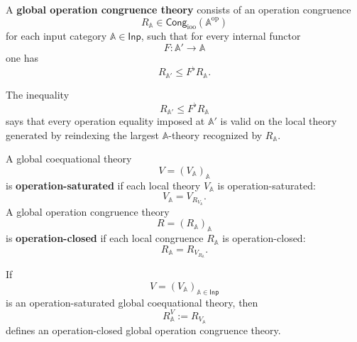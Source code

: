 \begin{definition}
\label{def:global-operation-congruence-theory-corrected}
    A \textbf{global operation congruence theory} consists of an operation
    congruence
    \[
        R_{\mathbb A}\in
        \mathsf{Cong}_{\mathrm{ioo}}(\mathbb A^{\mathrm{op}})
    \]
    for each input category \(\mathbb A\in\mathsf{Inp}\), such that for every
    internal functor
    \[
        F:\mathbb A'\to\mathbb A
    \]
    one has
    \[
        R_{\mathbb A'}\leq F^\flat R_{\mathbb A}.
    \]
\end{definition}

The inequality
\[
    R_{\mathbb A'}\leq F^\flat R_{\mathbb A}
\]
says that every operation equality imposed at \(\mathbb A'\) is valid on the
local theory generated by reindexing the largest \(\mathbb A\)-theory
recognized by \(R_{\mathbb A}\).

\begin{definition}
\label{def:global-operation-saturation-closure}
    A global coequational theory
    \[
        V=(V_{\mathbb A})_{\mathbb A}
    \]
    is \textbf{operation-saturated} if each local theory \(V_{\mathbb A}\) is
    operation-saturated:
    \[
        V_{\mathbb A}=V_{R_{V_{\mathbb A}}}.
    \]
    A global operation congruence theory
    \[
        R=(R_{\mathbb A})_{\mathbb A}
    \]
    is \textbf{operation-closed} if each local congruence \(R_{\mathbb A}\) is
    operation-closed:
    \[
        R_{\mathbb A}=R_{V_{R_{\mathbb A}}}.
    \]
\end{definition}

\begin{proposition}
\label{prop:saturated-global-theories-to-closed-global-congruences}
    If
    \[
        V=(V_{\mathbb A})_{\mathbb A\in\mathsf{Inp}}
    \]
    is an operation-saturated global coequational theory, then
    \[
        R^V_{\mathbb A}:=R_{V_{\mathbb A}}
    \]
    defines an operation-closed global operation congruence theory.
\end{proposition}

